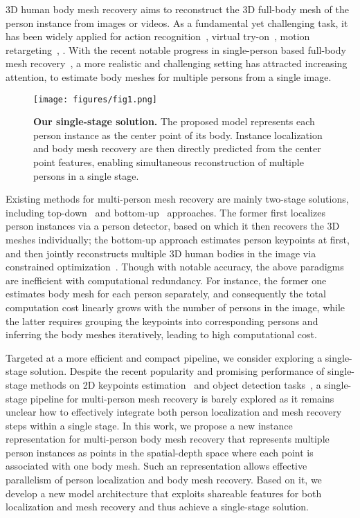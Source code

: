 \documentclass[final]{cvpr}
\begin{document}
3D human body mesh recovery aims to reconstruct the 3D full-body mesh of the person instance from images or videos.
As a fundamental yet challenging task, it has been widely applied for action recognition~\cite{varol2019synthetic}, virtual try-on~\cite{mir2020learning}, motion retargeting~\cite{liu2019liquid}, \etc. 
With the recent notable progress in single-person based full-body mesh recovery~\cite{hmrKanazawa17,kolotouros2019convolutional,arnab2019exploiting,kocabas2020vibe}, a  more realistic and challenging setting has attracted increasing attention, \ie to estimate  body meshes for multiple persons from a single image.

\begin{figure}[t]
	\centering
	\texttt{[image: figures/fig1.png]}
	\caption{
	\textbf{Our single-stage solution.}
    The proposed model represents each person instance as the center point of its body. Instance localization and body mesh recovery are then directly predicted from the center point features, enabling simultaneous reconstruction of multiple persons in a single stage.
    }
	\label{fig:fig1}
\end{figure}

Existing methods for multi-person mesh recovery are mainly two-stage solutions, including  top-down~\cite{jiang2020coherent} and bottom-up~\cite{zanfir2018monocular} approaches.
The former first localizes person instances via a person detector, based on which it then recovers the 3D meshes individually;
the bottom-up approach estimates person keypoints at first, and then jointly reconstructs multiple 3D human bodies in the image via constrained optimization~\cite{zanfir2018monocular}.
Though with notable accuracy, the above paradigms are inefficient with computational redundancy. 
For instance, the former one estimates body mesh for each person separately, and consequently the total computation cost linearly grows with the number of persons in the image, while the latter requires grouping the keypoints into corresponding persons and inferring the body meshes iteratively, leading to high computational cost.


Targeted at a more efficient and compact pipeline, we consider exploring a single-stage solution.
Despite the recent popularity and promising performance of single-stage methods on 2D keypoints estimation~\cite{nie2019spm} and object detection tasks~\cite{zhou2019objects,tian2019fcos}, a single-stage pipeline for multi-person mesh recovery is barely explored as it remains unclear how to effectively integrate both person localization and mesh recovery steps within a single stage.
In this work, we propose a new instance representation for multi-person body mesh recovery that represents multiple person instances  as points in the spatial-depth space where each point is associated with one body mesh.  
Such an representation allows effective parallelism of person localization and body mesh recovery.
Based on it, we develop a new model architecture that exploits shareable features for both localization and mesh recovery and thus achieve a single-stage solution.
\end{document}
